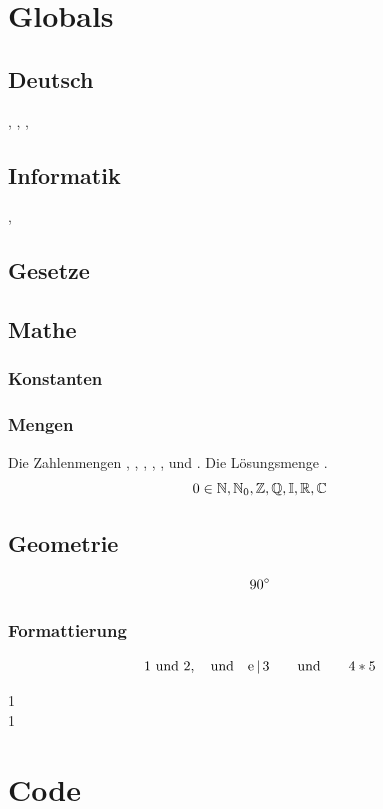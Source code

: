 \documentclass{article}
\begin{document}
\section{Globals}
\subsection{Deutsch}
\zb, \etc, \idr, 

\subsection{Informatik}
\bb, \bh

\subsection{Gesetze}
      

\GG

\subsection{Mathe}
\subsubsection{Konstanten}
\e

\subsubsection{Mengen}
Die Zahlenmengen \tN, \tNz, \tZ, \tQ, \tI, \tR und \tC. Die Lösungsmenge \tL.
\[
 0 \in \mathbb{N}, \mathbb{N}_0, \mathbb{Z}, \mathbb{Q}, \mathbb{I}, \mathbb{R}, \mathbb{C}
\]

\subsection{Geometrie}
\[
 90^\circ
\]

\subsubsection{Formattierung}
\[
 1 \ \text{und} \  2, \quad \text{und} \quad \text{e} \,\vert\, 3 \qquad \text{und} \qquad 4 * 5
\]
\begin{mathdescription}
  1 \\
  1
\end{mathdescription}

\section{Code}
\end{document}

